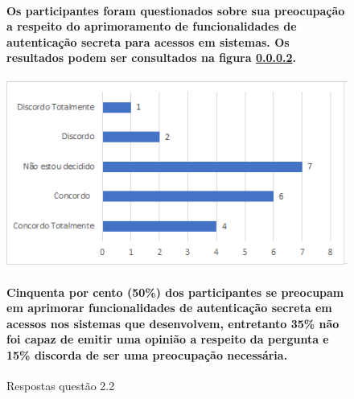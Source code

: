\begin{figure}[!t]
\centering
\paragraph{
Os participantes foram questionados sobre sua preocupação a respeito do aprimoramento de funcionalidades de autenticação secreta para acessos em sistemas. Os resultados podem ser consultados na figura \ref{fig:2.2}.
}
\includegraphics[scale=0.7]{figuras das questoes/2.2.png}
\caption{Respostas questão 2.2}

\paragraph{
Cinquenta por cento (50{\%}) dos participantes se preocupam em aprimorar funcionalidades de autenticação secreta em acessos nos sistemas que desenvolvem, entretanto 35{\%} não foi capaz de emitir uma opinião a respeito da pergunta e 15{\%} discorda de ser uma preocupação necessária.
}

\label{fig:2.2}
\end{figure}
